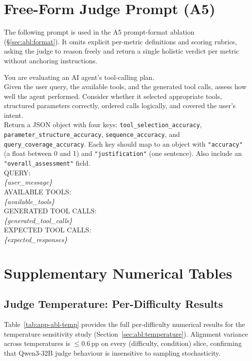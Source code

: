 \section{Free-Form Judge Prompt (A5)}
\label{app:prompt-freeform}

The following prompt is used in the A5 prompt-format ablation (\S\ref{sec:abl:format}). It omits explicit per-metric definitions and scoring rubrics, asking the judge to reason freely and return a single holistic verdict per metric without anchoring instructions.

\begin{promptbox}
\ttfamily\small
You are evaluating an AI agent's tool-calling plan.\\[4pt]
Given the user query, the available tools, and the generated tool calls, assess how well the agent performed. Consider whether it selected appropriate tools, structured parameters correctly, ordered calls logically, and covered the user's intent.\\[4pt]
Return a JSON object with four keys: \texttt{tool\_selection\_accuracy}, \texttt{parameter\_structure\_accuracy}, \texttt{sequence\_accuracy}, and \texttt{query\_coverage\_accuracy}. Each key should map to an object with \texttt{"accuracy"} (a float between 0 and 1) and \texttt{"justification"} (one sentence). Also include an \texttt{"overall\_assessment"} field.\\[6pt]
QUERY:\\
\textit{\{user\_message\}}\\[4pt]
AVAILABLE TOOLS:\\
\textit{\{available\_tools\}}\\[4pt]
GENERATED TOOL CALLS:\\
\textit{\{generated\_tool\_calls\}}\\[4pt]
EXPECTED TOOL CALLS:\\
\textit{\{expected\_responses\}}
\end{promptbox}

\section{Supplementary Numerical Tables}
\label{app:ablations}

\subsection*{Judge Temperature: Per-Difficulty Results}

Table~\ref{tab:app-abl-temp} provides the full per-difficulty numerical results for the temperature sensitivity study (Section~\ref{sec:abl:temperature}). Alignment variance across temperatures is $\leq 0.6$\,pp on every (difficulty, condition) slice, confirming that Qwen3-32B judge behaviour is insensitive to sampling stochasticity.

